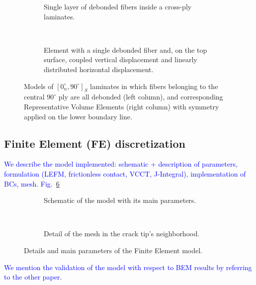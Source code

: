 \documentclass[review]{elsarticle}
\begin{document}
\begin{figure}[!h]
\centering
    \begin{subfigure}[b]{0.45\textwidth}
        \caption{Single layer of debonded fibers inside a cross-ply laminates.}\label{subfig:singlelayerdebfibers}
    \end{subfigure} ~
    \begin{subfigure}[b]{0.45\textwidth}
        \caption{Element with a single debonded fiber and, on the top surface, coupled vertical displacement and linearly distributed horizontal displacement.}\label{subfig:free}
    \end{subfigure}

\caption{Models of $\left[0^{\circ}_{n}, 90^{\circ}\right]_{S}$ laminates in which fibers belonging to the central $90^{\circ}$ ply are all debonded  (left column), and corresponding Representative Volume Elements (right column) with symmetry applied on the lower boundary line.}\label{fig:allFibersDebonded}
\end{figure}

\subsection{Finite Element (FE) discretization}

\textcolor{blue}{We describe the model implemented: schematic + description of parameters, formulation (LEFM, frictionless contact, VCCT, J-Integral), implementation of BCs, mesh. Fig.~\ref{fig:FEmodel}}

\begin{figure}[!h]
\centering
    \begin{subfigure}[b]{0.45\textwidth}
        \caption{Schematic of the model with its main parameters.}\label{subfig:modelschem}
    \end{subfigure} ~
    \begin{subfigure}[b]{0.45\textwidth}
        \caption{Detail of the mesh in the crack tip's neighborhood.}\label{subfig:meshdetail}
    \end{subfigure}

\caption{Details and main parameters of the Finite Element model.}\label{fig:FEmodel}
\end{figure}

\textcolor{blue}{We mention the validation of the model with respect to BEM results by referring to the other paper.}
\end{document}
